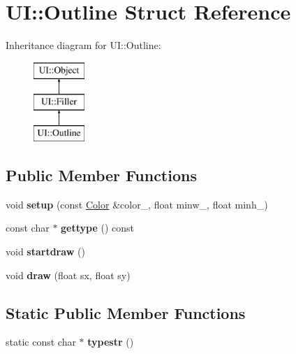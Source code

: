 \hypertarget{struct_u_i_1_1_outline}{}\section{UI\+:\+:Outline Struct Reference}
\label{struct_u_i_1_1_outline}
Inheritance diagram for UI\+:\+:Outline\+:\begin{figure}[H]
\begin{center}
\leavevmode
\includegraphics[height=3.000000cm]{struct_u_i_1_1_outline}
\end{center}
\end{figure}
\subsection*{Public Member Functions}
\begin{DoxyCompactItemize}
\item 
\mbox{\label{struct_u_i_1_1_outline_aabc5fbb315037f1ba2796e062285b11d}} 
void {\bfseries setup} (const \hyperlink{struct_u_i_1_1_color}{Color} \&color\+\_\+, float minw\+\_, float minh\+\_)
\item 
\mbox{\label{struct_u_i_1_1_outline_ac73495bf247a94ddcc4181c963cb566d}} 
const char $\ast$ {\bfseries gettype} () const
\item 
\mbox{\label{struct_u_i_1_1_outline_ac3097c3afd36a583687ef25b2fd55d18}} 
void {\bfseries startdraw} ()
\item 
\mbox{\label{struct_u_i_1_1_outline_a6b90be81db96ea5b46c6e9695a367483}} 
void {\bfseries draw} (float sx, float sy)
\end{DoxyCompactItemize}
\subsection*{Static Public Member Functions}
\begin{DoxyCompactItemize}
\item 
\mbox{\label{struct_u_i_1_1_outline_a2478e15f612163c8f6ed5a6cbf44d31b}} 
static const char $\ast$ {\bfseries typestr} ()
\end{DoxyCompactItemize}
